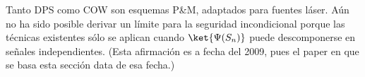 \documentclass[a4paper,11pt]{book} %
\numberwithin{equation}{chapter}
\begin{document}
Tanto DPS como COW son esquemas P\&M, adaptados para fuentes láser. Aún no ha sido posible derivar un límite para la seguridad incondicional porque las técnicas existentes sólo se aplican cuando $\ket{\Psi (S_n)}$ puede descomponerse en señales independientes. (Esta afirmación es a fecha del 2009, pues el paper en que se basa esta sección \cite{bib_QKD_resumen} data de esa fecha.)
		
	
	
		
	
		
		
	

	





\end{document}
